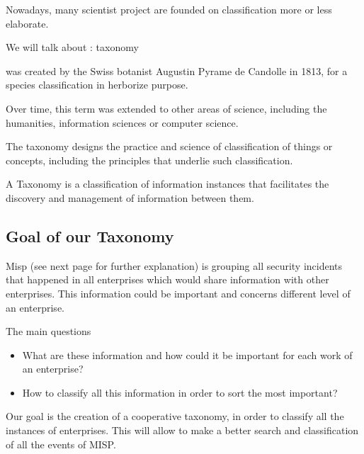 \documentclass[12pt]{report}
\begin{document}
\vspace{\baselineskip}
Nowadays, many scientist project are founded on  classification more or less elaborate.\par
We will talk about : taxonomy   \par\par was created by the Swiss botanist Augustin Pyrame de Candolle in 1813, for a species classification in herborize purpose.\par

Over time, this term was extended to other areas of science, including the humanities, information sciences or computer science.\par

The taxonomy designs the practice and science of classification of things or concepts, including the principles that underlie such classification.\par

A Taxonomy is a classification of information instances that facilitates the discovery and management of information between them.\par

\subsection*{Goal of our  Taxonomy}

\vspace{\baselineskip}
Misp (see next page for further explanation) is grouping all security incidents that happened in all enterprises which would share information with other enterprises. This information could be important and concerns different level of an enterprise. \par

The main questions  

\begin{itemize}
	\item What are these information and how could it be important for each work of an enterprise? 

	\item How to classify all this information in order to sort the most important?
\end{itemize}\par

Our goal is the creation of a cooperative taxonomy, in order to classify all the instances of enterprises. This will allow to make a better search and classification of all the events of MISP.\par
\end{document}
